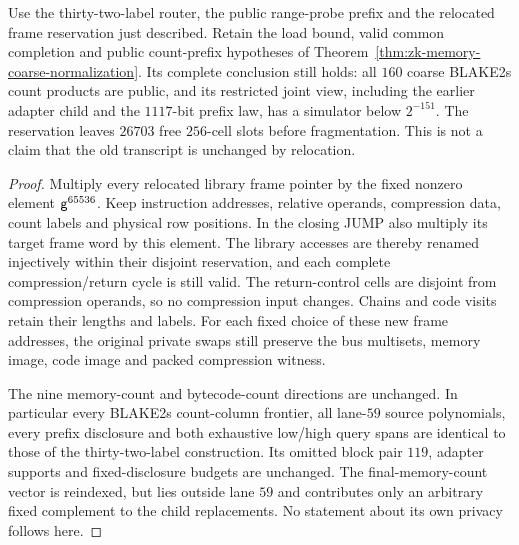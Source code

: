 \begin{corollary}\label{cor:zk-probe-relocated-interface}
Use the thirty-two-label router, the public range-probe prefix and the relocated frame reservation just described. Retain the load bound, valid common completion and public count-prefix hypotheses of Theorem~\ref{thm:zk-memory-coarse-normalization}. Its complete conclusion still holds: all $160$ coarse BLAKE2s count products are public, and its restricted joint view, including the earlier adapter child and the $1117$-bit prefix law, has a simulator below $2^{-151}$. The reservation leaves $26703$ free $256$-cell slots before fragmentation. This is not a claim that the old transcript is unchanged by relocation.
\end{corollary}
\begin{proof}
Multiply every relocated library frame pointer by the fixed nonzero element $\mathsf{g}^{65536}$. Keep instruction addresses, relative operands, compression data, count labels and physical row positions. In the closing JUMP also multiply its target frame word by this element. The library accesses are thereby renamed injectively within their disjoint reservation, and each complete compression/return cycle is still valid. The return-control cells are disjoint from compression operands, so no compression input changes. Chains and code visits retain their lengths and labels. For each fixed choice of these new frame addresses, the original private swaps still preserve the bus multisets, memory image, code image and packed compression witness.

The nine memory-count and bytecode-count directions are unchanged. In particular every BLAKE2s count-column frontier, all lane-$59$ source polynomials, every prefix disclosure and both exhaustive low/high query spans are identical to those of the thirty-two-label construction. Its omitted block pair $119$, adapter supports and fixed-disclosure budgets are unchanged. The final-memory-count vector is reindexed, but lies outside lane $59$ and contributes only an arbitrary fixed complement to the child replacements. No statement about its own privacy follows here.


\end{proof}
